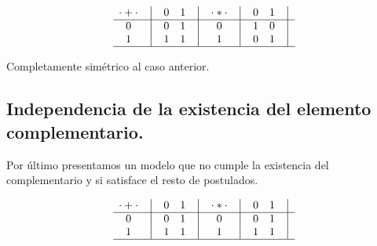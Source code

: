 \begin{equation}
    \begin{matrix}
        {\cdot + \cdot} & \big{\vert} & {0} & {1} & \big{\vert} \\
        \hline
        {0}             & \big{\vert} & {0} & {1} & \big{\vert} \\
        {1}             & \big{\vert} & {1} & {1} & \big{\vert} \\
        \hline
    \end{matrix}
    \quad
    \begin{matrix}
        {\cdot * \cdot} & \big{\vert} & {0} & {1} & \big{\vert} \\
        \hline
        {0}                   & \big{\vert} & {1} & {0} & \big{\vert} \\
        {1}                   & \big{\vert} & {0} & {1} & \big{\vert} \\
        \hline
    \end{matrix}
\end{equation}



	Completamente simétrico al caso anterior.



\subsection{Independencia de la existencia del elemento complementario.}



	Por último presentamos un modelo que no cumple la existencia del
complementario y si satisface el resto de postulados.



\begin{equation}
    \begin{matrix}
        {\cdot + \cdot} & \big{\vert} & {0} & {1} & \big{\vert} \\
        \hline
        {0}             & \big{\vert} & {0} & {1} & \big{\vert} \\
        {1}             & \big{\vert} & {1} & {1} & \big{\vert} \\
        \hline
    \end{matrix}
    \quad
    \begin{matrix}
        {\cdot * \cdot} & \big{\vert} & {0} & {1} & \big{\vert} \\
        \hline
        {0}                   & \big{\vert} & {0} & {1} & \big{\vert} \\
        {1}                   & \big{\vert} & {1} & {1} & \big{\vert} \\
        \hline
    \end{matrix}
\end{equation}



